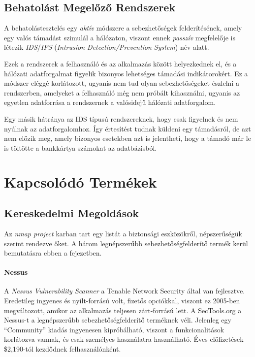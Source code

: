 \subsection*{Behatolást Megelőző Rendszerek}
	
	A behatolástesztelés egy \textit{aktív} módszere a sebezhetőségek felderítésének, amely egy valós támadást szimulál a hálózaton, viszont ennek \textit{passzív} megfelelője is létezik \textit{IDS}/\textit{IPS} (\textit{Intrusion Detection/Prevention System}) név alatt.
	
	Ezek a rendszerek a felhasználó és az alkalmazás között helyezkednek el, és a hálózati adatforgalmat figyelik bizonyos lehetséges támadási indikátorokért. Ez a módszer eléggé korlátozott, ugyanis nem tud olyan sebezhetőségeket észlelni a rendszerben, amelyeket a felhasználó még nem próbált kihasználni, ugyanis az egyetlen adatforrása a rendszernek a valósidejű hálózati adatforgalom.
	
	Egy másik hátránya az IDS típusú rendszereknek, hogy csak figyelnek és nem nyúlnak az adatforgalomhoz. Így értesítést tudnak küldeni egy támadásról, de azt nem előzik meg, amely bizonyos esetekben azt is jelentheti, hogy a támadó már le is töltötte a bankkártya számokat az adatbázisból.

\section*{Kapcsolódó Termékek}
	
\subsection*{Kereskedelmi Megoldások}
	
	Az \textit{nmap project} karban tart egy listát a biztonsági eszközökről, népszerűségük szerint rendezve őket\cite{sectools}. A három legnépszerűbb sebezhetőségfelderítő termék kerül bemutatásra ebben a fejezetben.
	
	\paragraph*{Nessus} A \textit{Nessus Vulnerability Scanner}\cite{nessus} a Tenable Network Security által van fejlesztve. Eredetileg ingyenes és nyílt-forrású volt, fizetős opciókkal, viszont ez 2005-ben megváltozott, amikor az alkalmazás teljesen zárt-forrású lett. A SecTools.org a Nessus-t a legnépszerűbb sebezhetőségfelderítő terméknek véli. Jelenleg egy ``Community'' kiadás ingyenesen kipróbálható, viszont a funkcionalitások korlátozva vannak, és csak személyes használatra használható. Éves előfizetések \$2,190-tól kezdődnek felhasználónként.
	
